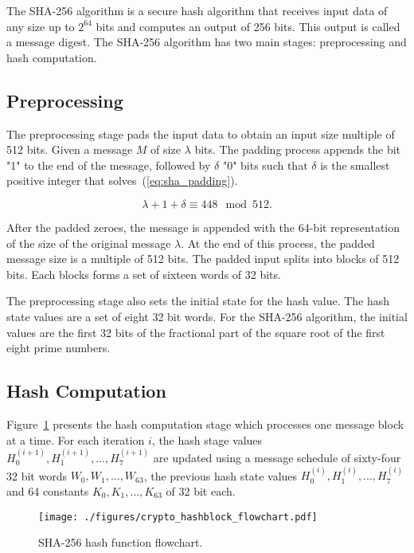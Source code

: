 The SHA-256 algorithm \cite{SHA_NIST_FIPS} is a secure hash algorithm that
receives input data of any size up to $2^{64}$ bits and computes an output of
256 bits. This output is called a message digest.
The SHA-256 algorithm has two main stages: preprocessing and hash
computation.

\subsection{Preprocessing}
\label{subsec:preprocessing}
The preprocessing stage pads the input data to obtain an input size multiple of
512 bits. Given a message $M$ of size $\lambda$ bits. The padding process
appends the bit "1" to the end of the message, followed by $\delta$ "0" bits
such that $\delta$ is the smallest positive integer that
solves~(\ref{eq:sha_padding}).

\begin{equation}
\lambda + 1 + \delta \equiv 448 \mod 512.
\label{eq:sha_padding}
\end{equation}

After the padded zeroes, the message is appended with the 64-bit representation
of the size of the original message $\lambda$. At the end of this process, the 
padded message size is a multiple of 512 bits. The padded input splits into
blocks of 512 bits. Each blocks forms a set of sixteen words of 32 bits. 

The preprocessing stage also sets the initial state for the hash value. The hash
state values are a set of eight 32 bit words. For the SHA-256 algorithm, the
initial values are the first 32 bits of the fractional part of the square root
of the first eight prime numbers.

\subsection{Hash Computation}
\label{subsec:hash_computation}

Figure~\ref{fig:hash_flowchart} presents the hash computation stage which
processes one message block at a time. For each iteration $i$, the hash stage
values $H_{0}^{(i+1)}, H_{1}^{(i+1)},..., H_{7}^{(i+1)}$ are updated using a
message schedule of sixty-four 32 bit words $W_0, W_1,..., W_{63}$, the
previous hash state values $H_{0}^{(i)}, H_{1}^{(i)},..., H_{7}^{(i)}$ and 64
constants $K_{0},K_{1},...,K_{63}$ of 32 bit each.

\begin{figure}[!htbp]
    \centerline{\texttt{[image: ./figures/crypto\_hashblock\_flowchart.pdf]}}
    \vspace{0cm}\caption{SHA-256 hash function flowchart.}
    \label{fig:hash_flowchart}
\end{figure}

